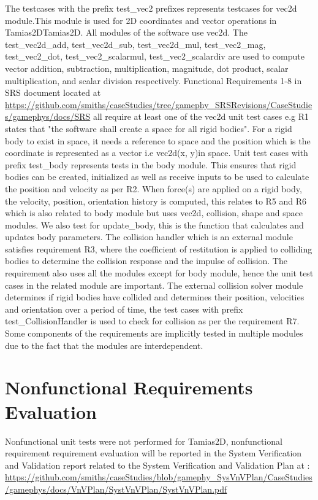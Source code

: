 \documentclass[12pt, titlepage]{article}
\newcommand{\progname}{Tamias2D}
\begin{document}
The testcases with the prefix test\_vec2 prefixes represents testcases for vec2d module.This module is used for 2D coordinates and vector operations in \progname{Tamias2D}. All modules of the software use vec2d. The test\_vec2d\_add, test\_vec2d\_sub, test\_vec2d\_mul, test\_vec2\_mag, test\_vec2\_dot, test\_vec2\_scalarmul, test\_vec2\_scalardiv are used to compute vector addition, subtraction, multiplication, magnitude, dot product, scalar multiplication, and scalar division respectively. Functional Requirements 1-8 in SRS document located at \url{https://github.com/smiths/caseStudies/tree/gamephy_SRSRevisions/CaseStudies/gamephys/docs/SRS} all require at least one of the vec2d unit test cases e.g R1 states that "the software shall create a space for all rigid bodies". For a rigid body to exist in space, it needs a reference to space and the position which is the coordinate is represented as a vector i.e vec2d(x, y)in space.
Unit test cases with prefix test\_body represents tests in the body module. This ensures that rigid bodies can be created, initialized as well as receive inputs to be used to calculate the position and velocity as per R2. When force(s) are applied on a rigid body, the velocity, position, orientation history is computed, this relates to R5 and R6 which is also related to body module but uses vec2d, collision, shape and space modules. We also test for update\_body, this is the function that calculates and updates body parameters. The collision handler which is an external module satisfies requirement R3, where the coefficient of restitution is applied to colliding bodies to determine the collision response and the impulse of collision. The requirement also uses all the modules except for body module, hence the unit test cases in the related module are important. The external collision solver module determines if rigid bodies have collided and determines their position, velocities and orientation over a period of time, the test cases with prefix test\_CollisionHandler is used to check for collision as per the requirement R7. Some components of the requirements are implicitly tested in multiple modules due to the fact that the modules are interdependent. 

\section{Nonfunctional Requirements Evaluation}
Nonfunctional unit tests were not performed for \progname, nonfunctional requirement requirement evaluation will be reported in the System Verification and Validation report related to the System Verification and Validation Plan at : \url{https://github.com/smiths/caseStudies/blob/gamephy_SysVnVPlan/CaseStudies/gamephys/docs/VnVPlan/SystVnVPlan/SystVnVPlan.pdf}
	
\end{document}
